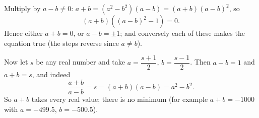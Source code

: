 Multiply by $a-b\ne0$: $a+b=(a^2-b^2)(a-b)=(a+b)(a-b)^2$, so
\[
(a+b)\left((a-b)^2-1\right)=0 .
\]
Hence either $a+b=0$, or $a-b=\pm1$; and conversely each of these makes the equation true (the steps reverse since $a\ne b$).

Now let $s$ be any real number and take $a=\dfrac{s+1}{2}$, $b=\dfrac{s-1}{2}$. Then $a-b=1$ and $a+b=s$, and indeed
\[
\dfrac{a+b}{a-b}=s=(a+b)(a-b)=a^2-b^2 .
\]
So $a+b$ takes every real value; there is $\boxed{\text{no minimum}}$ (for example $a+b=-1000$ with $a=-499.5$, $b=-500.5$).
